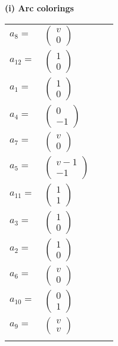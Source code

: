 \documentclass[1p]{elsarticle_modified}
\theoremstyle{definition}
\begin{document}
\flushleft \textbf{(i) Arc colorings}\\
\begin{tabular}{m{7pt} m{180pt} m{7pt} m{180pt} }
\flushright $a_{8}=$&$\begin{pmatrix}v\\0\end{pmatrix}$ \\
\flushright $a_{12}=$&$\begin{pmatrix}1\\0\end{pmatrix}$ \\
\flushright $a_{1}=$&$\begin{pmatrix}1\\0\end{pmatrix}$ \\
\flushright $a_{4}=$&$\begin{pmatrix}0\\-1\end{pmatrix}$ \\
\flushright $a_{7}=$&$\begin{pmatrix}v\\0\end{pmatrix}$ \\
\flushright $a_{5}=$&$\begin{pmatrix}v-1\\-1\end{pmatrix}$ \\
\flushright $a_{11}=$&$\begin{pmatrix}1\\1\end{pmatrix}$ \\
\flushright $a_{3}=$&$\begin{pmatrix}1\\0\end{pmatrix}$ \\
\flushright $a_{2}=$&$\begin{pmatrix}1\\0\end{pmatrix}$ \\
\flushright $a_{6}=$&$\begin{pmatrix}v\\0\end{pmatrix}$ \\
\flushright $a_{10}=$&$\begin{pmatrix}0\\1\end{pmatrix}$ \\
\flushright $a_{9}=$&$\begin{pmatrix}v\\v\end{pmatrix}$\\&\end{tabular}
\end{document}
